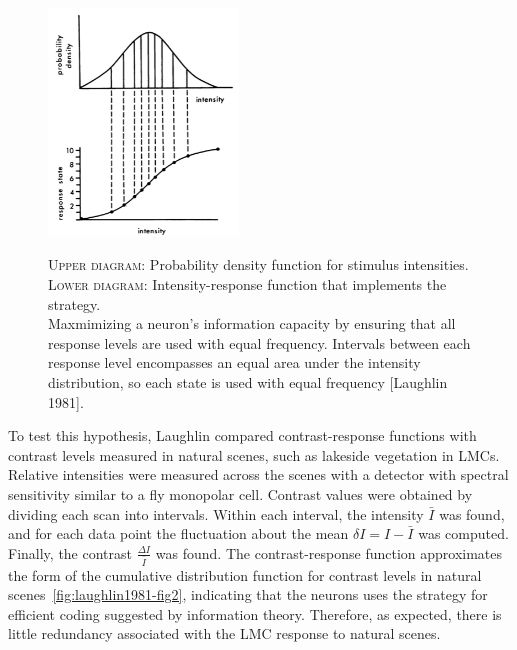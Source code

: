 \documentclass[twoside]{article}
\begin{document}
\begin{multicols}{2}
\begin{figure}[H]
	\caption{
		\textsc{Upper diagram:} Probability density function for stimulus intensities. \\ \textsc{Lower diagram:} Intensity-response function that implements the strategy. \\ Maxmimizing a neuron's information capacity by ensuring that all response levels are used with equal frequency. Intervals between each response level encompasses an equal area under the intensity distribution, so each state is used with equal frequency [Laughlin 1981]. \\
	}
	\includegraphics[width=0.45\textwidth]{laughlin1981-fig1}
	\label{fig:laughlin1981-fig1}
\end{figure}

To test this hypothesis, Laughlin compared contrast-response functions with contrast levels measured in natural scenes, such as lakeside vegetation in LMCs. Relative intensities were measured across the scenes with a detector with spectral sensitivity similar to a fly monopolar cell. Contrast values were obtained by dividing each scan into intervals. Within each interval, the intensity $\bar{I}$ was found, and for each data point the fluctuation about the mean $\delta I = I - \bar{I}$ was computed. Finally, the contrast $\displaystyle\frac{\Delta I}{\bar{I}}$ was found. The contrast-response function approximates the form of the cumulative distribution function for contrast levels in natural scenes~\ref{fig:laughlin1981-fig2}, indicating that the neurons uses the strategy for efficient coding suggested by information theory. Therefore, as expected, there is little redundancy associated with the LMC response to natural scenes. 


\end{multicols}
\end{document}
